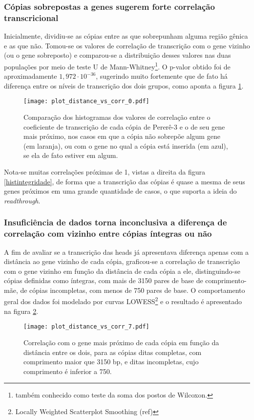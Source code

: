 \documentclass[12pt]{article}
\begin{document}
\begin{multicols}{2}
\subsubsection{Cópias sobrepostas a genes sugerem forte correlação transcricional}
Inicialmente, dividiu-se as cópias entre as que sobrepunham alguma região gênica e as que não. Tomou-se os valores de correlação de transcrição com o gene vizinho (ou o gene sobreposto) e comparou-se a distribuição desses valores nas duas populações por meio de teste U de Mann-Whitney\footnote{também conhecido como teste da soma dos postos de Wilcoxon.}. O p-valor obtido foi de aproximadamente \(1,972 \cdot 10^{-36}\), sugerindo muito fortemente que de fato há diferença entre os níveis de transcrição dos dois grupos, como aponta a figura \ref{histolap}.

\begin{figure}[H]
	\centering
	\label{histolap}
	\texttt{[image: plot\_distance\_vs\_corr\_0.pdf]}
	\caption{Comparação dos histogramas dos valores de correlação entre o coeficiente de transcrição de cada cópia de Pererê-3 e o de seu gene mais próximo, nos casos em que a cópia não sobrepõe algum gene (em laranja), ou com o gene no qual a cópia está inserida (em azul), se ela de fato estiver em algum.}
\end{figure}

Nota-se muitas correlações próximas de 1, vistas a direita da figura \ref{histintegridade}, de forma que a transcrição das cópias é quase a mesma de seus genes próximos em uma grande quantidade de casos, o que suporta a ideia do \textit{readthrough}.

\subsubsection{Insuficiência de dados torna inconclusiva a diferença de correlação com vizinho entre cópias íntegras ou não}
A fim de avaliar se a transcrição das heads já apresentava diferença apenas com a distância ao gene vizinho de cada cópia, graficou-se a correlação de transcrição com o gene vizinho em função da distância de cada cópia a ele, distinguindo-se cópias definidas como íntegras, com mais de 3150 pares de base de comprimento-mãe, de cópias incompletas, com menos de 750 pares de base. O comportamento geral dos dados foi modelado por curvas LOWESS\footnote{Locally Weighted Scatterplot Smoothing (ref)} e o resultado é apresentado na figura \ref{completude}.

\begin{figure}[H]
	\centering
	\label{completude}
	\texttt{[image: plot\_distance\_vs\_corr\_7.pdf]}
	\caption{Correlação com o gene mais próximo de cada cópia em função da distância entre os dois, para as cópias ditas completas, com comprimento maior que 3150 bp, e ditas incompletas, cujo comprimento é inferior a 750.}
\end{figure}


\end{multicols}
\end{document}
